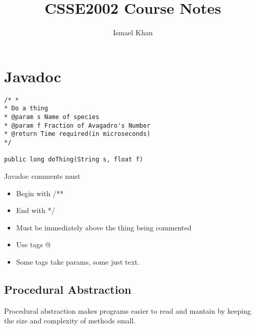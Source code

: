 \documentclass{article}
\title{CSSE2002 Course Notes}
\author{Ismael Khan}
\date{}
\theoremstyle{remark}
\theoremstyle{definition}
\begin{document}
\maketitle
\section*{Javadoc}

\begin{lstlisting}
/* *
* Do a thing
* @param s Name of species
* @param f Fraction of Avagadro's Number
* @return Time required(in microseconds)
*/

public long doThing(String s, float f)
\end{lstlisting}
Javadoc comments must
\begin{itemize}
  \item Begin with /**
  \item End with */
  \item Must be immediately above the thing being commented
  \item Use tags @
  \item Some tags take params, some just text.
\end{itemize}
\subsection*{Procedural Abstraction}
Procedural abstraction makes programs easier to read and mantain by keeping
the size and complexity of methods small.
\end{document}
